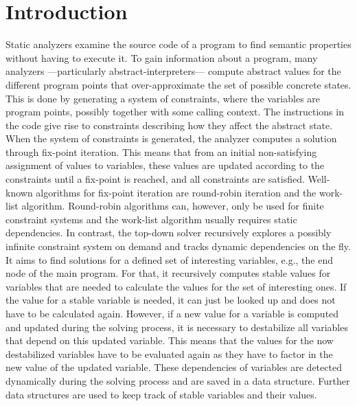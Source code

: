\section{Introduction}
\label{sec:introduction}
Static analyzers examine the source code of a program to find semantic properties without having to execute it. To gain information about a program, many analyzers ---particularly abstract-interpreters--- compute abstract values for the different program points that over-approximate the set of possible concrete states. This is done by generating a system of constraints, where the variables are program points, possibly together with some calling context. The instructions in the code give rise to constraints describing how they affect the abstract state. When the system of constraints is generated, the analyzer computes a solution through fix-point iteration. This means that from an initial non-satisfying assignment of values to variables, these values are updated according to the constraints until a fix-point is reached, and all constraints are satisfied. Well-known algorithms for fix-point iteration are round-robin iteration and the work-list algorithm. Round-robin algorithms can, however, only be used for finite constraint systems and the work-list algorithm usually requires static dependencies. In contrast, the top-down solver recursively explores a possibly infinite constraint system on demand and tracks dynamic dependencies on the fly. It aims to find solutions for a defined set of interesting variables, e.g., the end node of the main program. For that, it recursively computes stable values for variables that are needed to calculate the values for the set of interesting ones. If the value for a stable variable is needed, it can just be looked up and does not have to be calculated again. However, if a new value for a variable is computed and updated during the solving process, it is necessary to destabilize all variables that depend on this updated variable. This means that the values for the now destabilized variables have to be evaluated again as they have to factor in the new value of the updated variable. These dependencies of variables are detected dynamically during the solving process and are saved in a data structure. Further data structures are used to keep track of stable variables and their values. 
